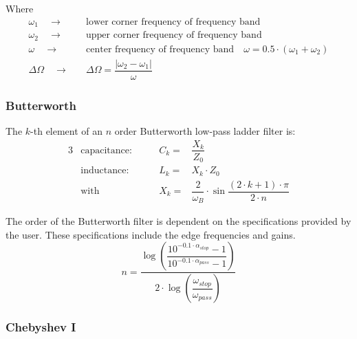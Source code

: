 Where
\begin{align}
\omega_1 \quad\rightarrow\quad & \text{lower corner frequency of frequency band} \\
\omega_2 \quad\rightarrow\quad & \text{upper corner frequency of frequency band} \\
\omega   \quad\rightarrow\quad & \text{center frequency of frequency band} \quad \omega = 0.5\cdot (\omega_1 + \omega_2) \\
\Delta\Omega \quad\rightarrow\quad & \Delta\Omega = \dfrac{|\omega_2 - \omega_1|}{\omega}
\end{align}

\subsubsection{Butterworth}

The $k$-th element of an $n$ order Butterworth low-pass ladder filter is:
\begin{alignat}{3}
 & \text{capacitance:} \qquad & C_k = & \dfrac{X_k}{Z_0} \\
 & \text{inductance:}  \qquad & L_k = & X_k \cdot Z_0 \\
 & \text{with}         \qquad & X_k = & \dfrac{2}{\omega_B} \cdot \sin \dfrac{(2\cdot k + 1)\cdot\pi}{2\cdot n}
\end{alignat}

The order of the Butterworth filter is dependent on the specifications
provided by the user.  These specifications include the edge
frequencies and gains.
\begin{equation}
\label{eq:ButtOrder}
n = \dfrac{\log{\left(\dfrac{10^{-0.1\cdot \alpha_{stop}} - 1}{10^{-0.1\cdot \alpha_{pass}} - 1}\right)}}{2\cdot\log{\left(\dfrac{\omega_{stop}}{\omega_{pass}}\right)}}
\end{equation}

\subsubsection{Chebyshev I}

